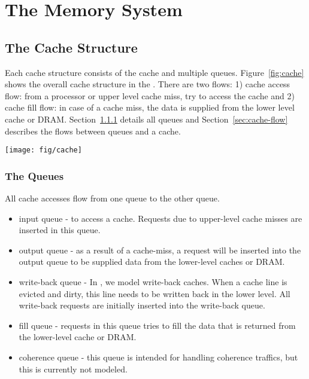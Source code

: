 
\clearpage
\section{The Memory System}

\subsection{The Cache Structure}

Each cache structure consists of the cache and multiple
queues. Figure~\ref{fig:cache} shows the overall cache structure in
the \SIM. There are two flows: 1) cache access flow: from a processor
or upper level cache miss, try to access the cache and 2) cache fill
flow: in case of a cache miss, the data is supplied from the lower
level cache or DRAM. Section~\ref{sec:queue} details all queues and
Section~\ref{sec:cache-flow} describes the flows between queues and a
cache.

\begin{figure*}[htb]
\centering
\texttt{[image: fig/cache]}
\caption{The cache structure.}
\label{fig:cache}
\end{figure*}


\subsubsection{The Queues}
\label{sec:queue}

All cache accesses flow from one queue to the other queue. 

\begin{itemize}
  \item input queue - to access a cache. Requests due to upper-level
  cache misses are inserted in this queue.

  \item output queue - as a result of a cache-miss, a request will be
  inserted into the output queue to be supplied data from the
  lower-level caches or DRAM.

  \item write-back queue - In \SIM, we model write-back caches. When a
  cache line is evicted and dirty, this line needs to be written back
  in the lower level. All write-back requests are initially inserted
  into the write-back queue.

  \item fill queue - requests in this queue tries to fill the data
  that is returned from the lower-level cache or DRAM.

  \item coherence queue - this queue is intended for handling
  coherence traffics, but this is currently not modeled.
\end{itemize}


